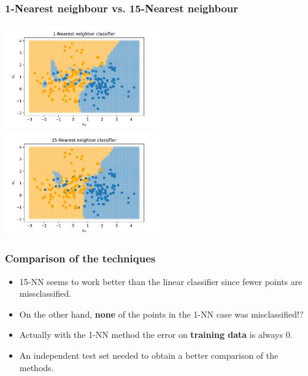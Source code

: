 \documentclass[notes]{beamer}          %
\begin{document}
\begin{frame}
\frametitle{1-Nearest neighbour vs. 15-Nearest neighbour}
    \begin{center}
        \includegraphics[width=0.5\textwidth]{figures/week_1/1-nn.pdf}
        \hfill
        \includegraphics[width=0.5\textwidth]{figures/week_1/15-nn.pdf}
    \end{center}
\end{frame}


\begin{frame}
\frametitle{Comparison of the techniques}
    \begin{itemize}
        \item 15-NN seems to work better than the linear classifier since fewer points are missclassified.
        \item On the other hand, {\bf none} of the points in the 1-NN case was misclassified!?
        \item Actually with the 1-NN method the error on {\bf training data} is always 0.
        \item An independent test set needed to obtain a better comparison of the methods.
    \end{itemize}
\end{frame}
\end{document}
